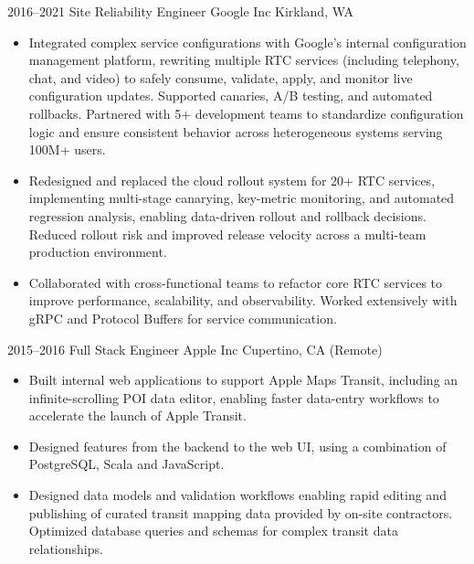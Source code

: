 \documentclass[11pt,letterpaper,sans]{moderncv}
\begin{document}
\cventry
  {2016--2021}
  {Site Reliability Engineer}
  {Google Inc}
  {Kirkland, WA}
  {}
  {
    \begin{itemize}
      \item Integrated complex service configurations with Google's internal
        configuration management platform, rewriting multiple RTC services
        (including telephony, chat, and video) to safely consume, validate,
        apply, and monitor live configuration updates. Supported canaries, A/B
        testing, and automated rollbacks. Partnered with 5+ development teams to
        standardize configuration logic and ensure consistent behavior across
        heterogeneous systems serving 100M+ users.
      \item Redesigned and replaced the cloud rollout system for 20+ RTC
        services, implementing multi-stage canarying, key-metric monitoring, and
        automated regression analysis, enabling data-driven rollout and rollback
        decisions. Reduced rollout risk and improved release velocity across a
        multi-team production environment.
      \item Collaborated with cross-functional teams to refactor core RTC
        services to improve performance, scalability, and observability. Worked extensively with gRPC and Protocol Buffers for service communication.
    \end{itemize}
  }

\cventry
  {2015--2016}
  {Full Stack Engineer}
  {Apple Inc}
  {Cupertino, CA (Remote)}
  {}
  {
    \begin{itemize}
    \item Built internal web applications to support Apple Maps Transit, including an infinite-scrolling POI data editor, enabling faster data-entry workflows to accelerate the launch of Apple Transit.
    \item Designed features from the backend to the web UI, using a combination of PostgreSQL, Scala and JavaScript.
    \item Designed data models and validation workflows enabling rapid editing and publishing of curated transit mapping data provided by on-site contractors. Optimized database queries and schemas for complex transit data relationships.
    \end{itemize}
  }
\end{document}
